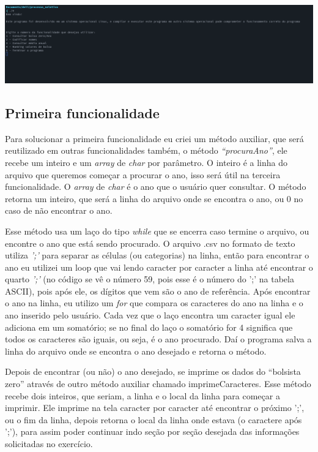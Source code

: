 \documentclass[11pt]{article}
\begin{document}
\includegraphics[width=15cm]{menu.png}

\subsection{Primeira funcionalidade}
\label{sec:org953db16}
Para solucionar a primeira funcionalidade eu criei um método auxiliar, que será reutilizado em outras funcionalidades também, o método \emph{``procuraAno''}, ele recebe um inteiro e um \emph{array} de \emph{char} por parâmetro. O inteiro é a linha do arquivo que queremos começar a procurar o ano, isso será útil na terceira funcionalidade. O \emph{array} de \emph{char} é o ano que o usuário quer consultar. O método retorna um inteiro, que será a linha do arquivo onde se encontra o ano, ou 0 no caso de não encontrar o ano.

Esse método usa um laço do tipo \emph{while} que se encerra caso termine o arquivo, ou encontre o ano que está sendo procurado. O arquivo .csv no formato de texto utiliza \emph{';'} para separar as células (ou categorias) na linha, então para encontrar o ano eu utilizei um loop que vai lendo caracter por caracter a linha até encontrar o quarto \emph{';'} (no código se vê o número 59, pois esse é o número do ';' na tabela ASCII), pois após ele, os dígitos que vem são o ano de referência. Após encontrar o ano na linha, eu utilizo um \emph{for} que compara os caracteres do ano na linha e o ano inserido pelo usuário. Cada vez que o laço encontra um caracter igual ele adiciona em um somatório; se no final do laço o somatório for 4 significa que todos os caracteres são iguais, ou seja, é o ano procurado. Daí o programa salva a linha do arquivo onde se encontra o ano desejado e retorna o método.

Depois de encontrar (ou não) o ano desejado, se imprime os dados do ``bolsista zero'' através de outro método auxiliar chamado imprimeCaracteres. Esse método recebe dois inteiros, que seriam, a linha e o local da linha para começar a imprimir. Ele imprime na tela caracter por caracter até encontrar o próximo ';', ou o fim da linha, depois retorna o local da linha onde estava (o caractere após ';'), para assim poder continuar indo seção por seção desejada das informações solicitadas no exercício.
\end{document}
